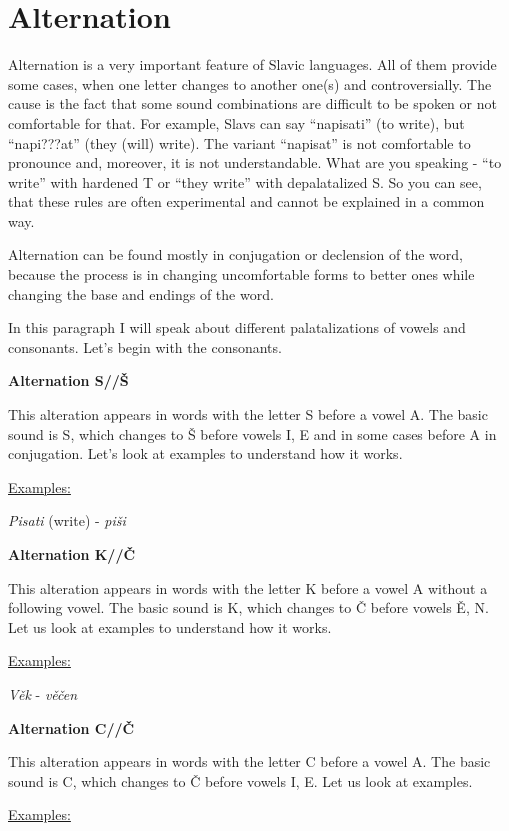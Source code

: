 \section{Alternation}

Alternation is a very important feature of Slavic languages. All of them provide some cases, when one letter changes to another one(s) and controversially. The cause is the fact that some sound combinations are difficult to be spoken or not comfortable for that. For example, Slavs can say “napisati” (to write), but “napi???at” (they (will) write). The variant “napisat” is not comfortable to pronounce and, moreover, it is not understandable. What are you speaking - “to write” with hardened T or “they write” with depalatalized S. So you can see, that these rules are often experimental and cannot be explained in a common way.

Alternation can be found mostly in conjugation or declension of the word, because the process is in changing uncomfortable forms to better ones while changing the base and endings of the word. 

In this paragraph I will speak about different palatalizations of vowels and consonants. Let’s begin with the consonants.

\textbf{Alternation S//Š}

This alteration appears in words with the letter S before a vowel A. The basic sound is S, which changes to Š before vowels I, E and in some cases before A in conjugation. Let’s look at examples to understand how it works.

\underline{Examples:}

\textit{Pisati} (write) \textipa{[’pisat1]} - \textit{piši} \textipa{[pi’\:s1]}

\textbf{Alternation K//Č}

This alteration appears in words with the letter K before a vowel A without a following vowel. The basic sound is K, which changes to Č before vowels Ě, N. Let us look at examples to understand how it works.

\underline{Examples:}

\textit{Věk} \textipa{[vIk]} - \textit{věčen} \textipa{['vI\t{tS}en]}

\textbf{Alternation C//Č}

This alteration appears in words with the letter C before a vowel A. The basic sound is C, which changes to Č before vowels I, E. Let us look at examples.

\underline{Examples:}

